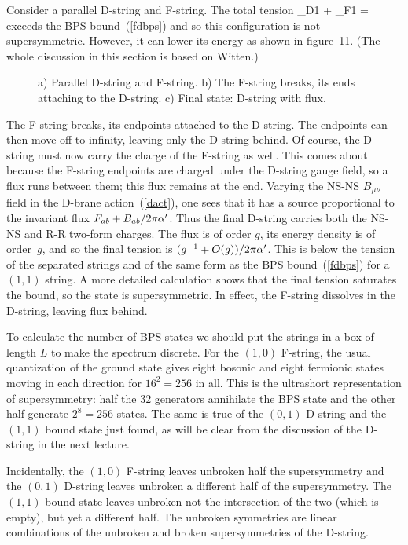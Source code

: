 Consider a parallel D-string and F-string.  The total
tension
\be
\tau_{D1} + \tau_{F1} = 
\ee 
exceeds the BPS
bound~(\ref{fdbps}) and so this configuration is not supersymmetric.  However,
it can lower its energy as shown in figure~11.  (The whole discussion in
this section is based on Witten.\cite{witbound})
\begin{figure}
\begin{center}
\leavevmode
{}
\end{center}
\caption[]{a) Parallel D-string and F-string.  b) The F-string breaks, its
ends attaching to the D-string.  c) Final state: D-string with flux.}
\end{figure}
The F-string breaks, its endpoints attached to the D-string.  The endpoints
can then move off to infinity, leaving only the D-string behind.  Of course,
the D-string must now carry the charge of the F-string as well.  This comes
about because the F-string endpoints are charged under the D-string gauge
field, so a flux runs between them; this flux remains at the end.  Varying the
NS-NS $B_{\mu\nu}$ field in the D-brane action~(\ref{dact}), one sees that it
has a source proportional to the invariant flux $F_{ab} + B_{ab} / 2\pi\alpha'$. 
Thus the final D-string carries both the NS-NS and R-R two-form charges.  The
flux is of order $g$, its energy density is of order~$g$, and
so the final tension is $(g^{-1} + O(g))/2\pi\alpha'$.  This is below the tension
of the separated strings and of the same form as the BPS bound~(\ref{fdbps})
for a $(1,1)$ string.  A more detailed calculation shows that the final
tension saturates the bound,\cite{rract} so the state is supersymmetric.  In
effect, the F-string dissolves in the D-string, leaving flux behind.

To calculate the number of BPS states we should put the strings in a box of
length $L$ to make the spectrum discrete.  For the $(1,0)$ F-string, the usual
quantization of the ground state gives eight bosonic and eight fermionic
states moving in each direction for $16^2 = 256$ in all.  This is the
ultrashort representation of supersymmetry: half the 32 generators
annihilate the BPS state and the other half generate $2^8 = 256$ states.  The
same is true of the $(0,1)$ D-string and the $(1,1)$ bound state just found,
as will be clear from the discussion of the D-string in the next lecture.

Incidentally, the $(1,0)$ F-string leaves unbroken half the supersymmetry and
the $(0,1)$ D-string leaves unbroken a different half of the supersymmetry. 
The $(1,1)$ bound state leaves unbroken not the intersection of the two
(which is empty), but yet a different half.  The unbroken symmetries are
linear combinations of the unbroken and broken supersymmetries of the
D-string.

